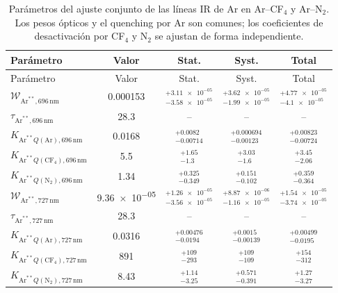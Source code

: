 \begin{longtable}{lcccc}
\caption{Parámetros del ajuste conjunto de las líneas IR de Ar en Ar--CF$_4$ y Ar--N$_2$. Los pesos ópticos y el quenching por Ar son comunes; los coeficientes de desactivación por CF$_4$ y N$_2$ se ajustan de forma independiente.}
\label{tab:ArJoint_IR_primary_stat_syst}\\
\toprule
Parámetro & Valor & Stat. & Syst. & Total \\
\midrule
\endfirsthead
\toprule
Parámetro & Valor & Stat. & Syst. & Total \\
\midrule
\endhead
$\mathcal{W}_{\mathrm{Ar}^{**},696\,\mathrm{nm}}$ & \num{0.000153} & $^{+\num{3.11e-05}}_{-\num{3.58e-05}}$ & $^{+\num{3.62e-05}}_{-\num{1.99e-05}}$ & $^{+\num{4.77e-05}}_{-\num{4.1e-05}}$ \\
$\tau_{\mathrm{Ar}^{**},696\,\mathrm{nm}}$ & \num{28.3} & -- & -- & -- \\
$K_{\mathrm{Ar}^{**}Q(\mathrm{Ar}),696\,\mathrm{nm}}$ & \num{0.0168} & $^{+\num{0.0082}}_{-\num{0.00714}}$ & $^{+\num{0.000694}}_{-\num{0.00123}}$ & $^{+\num{0.00823}}_{-\num{0.00724}}$ \\
$K_{\mathrm{Ar}^{**}Q(\mathrm{CF}_4),696\,\mathrm{nm}}$ & \num{5.5} & $^{+\num{1.65}}_{-\num{1.3}}$ & $^{+\num{3.03}}_{-\num{1.6}}$ & $^{+\num{3.45}}_{-\num{2.06}}$ \\
$K_{\mathrm{Ar}^{**}Q(\mathrm{N}_2),696\,\mathrm{nm}}$ & \num{1.34} & $^{+\num{0.325}}_{-\num{0.349}}$ & $^{+\num{0.151}}_{-\num{0.102}}$ & $^{+\num{0.359}}_{-\num{0.364}}$ \\
\midrule
$\mathcal{W}_{\mathrm{Ar}^{**},727\,\mathrm{nm}}$ & \num{9.36e-05} & $^{+\num{1.26e-05}}_{-\num{3.56e-05}}$ & $^{+\num{8.87e-06}}_{-\num{1.16e-05}}$ & $^{+\num{1.54e-05}}_{-\num{3.74e-05}}$ \\
$\tau_{\mathrm{Ar}^{**},727\,\mathrm{nm}}$ & \num{28.3} & -- & -- & -- \\
$K_{\mathrm{Ar}^{**}Q(\mathrm{Ar}),727\,\mathrm{nm}}$ & \num{0.0316} & $^{+\num{0.00476}}_{-\num{0.0194}}$ & $^{+\num{0.0015}}_{-\num{0.00139}}$ & $^{+\num{0.00499}}_{-\num{0.0195}}$ \\
$K_{\mathrm{Ar}^{**}Q(\mathrm{CF}_4),727\,\mathrm{nm}}$ & \num{891} & $^{+\num{109}}_{-\num{293}}$ & $^{+\num{109}}_{-\num{109}}$ & $^{+\num{154}}_{-\num{312}}$ \\
$K_{\mathrm{Ar}^{**}Q(\mathrm{N}_2),727\,\mathrm{nm}}$ & \num{8.43} & $^{+\num{1.14}}_{-\num{3.25}}$ & $^{+\num{0.571}}_{-\num{0.391}}$ & $^{+\num{1.27}}_{-\num{3.27}}$ \\

\end{longtable}
